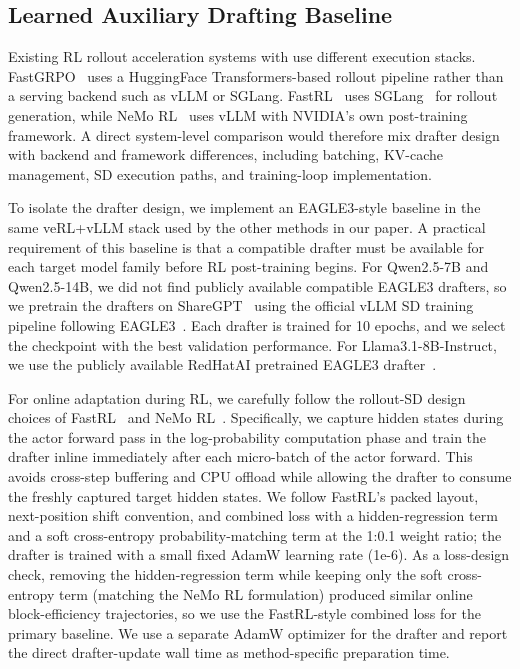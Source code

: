 

\subsection{Learned Auxiliary Drafting Baseline}
\label{app:learned_auxiliary_drafting}

Existing RL rollout acceleration systems with \learned{} use different execution stacks.
FastGRPO~\citep{zhang2025fastgrpo} uses a HuggingFace Transformers-based rollout pipeline rather than a serving backend such as vLLM or SGLang.
FastRL~\citep{hu2026taming} uses SGLang~\citep{zheng2024sglang} for rollout generation, while NeMo RL~\citep{iso2026accelerating} uses vLLM with NVIDIA's own post-training framework.
A direct system-level comparison would therefore mix drafter design with backend and framework differences, including batching, KV-cache management, SD execution paths, and training-loop implementation.

To isolate the drafter design, we implement an EAGLE3-style \learned{} baseline in the same veRL+vLLM stack used by the other methods in our paper.
A practical requirement of this baseline is that a compatible drafter must be available for each target model family before RL post-training begins.
For Qwen2.5-7B and Qwen2.5-14B, we did not find publicly available compatible EAGLE3 drafters, so we pretrain the drafters on ShareGPT~\citep{aeala2023sharegpt} using the official vLLM SD training pipeline following EAGLE3~\citep{li2025eagle}.
Each drafter is trained for 10 epochs, and we select the checkpoint with the best validation performance.
For Llama3.1-8B-Instruct, we use the publicly available RedHatAI pretrained EAGLE3 drafter~\citep{redhatai2025llama31eagle3}.

For online adaptation during RL, we carefully follow the rollout-SD design choices of FastRL~\citep{hu2026taming} and NeMo RL~\citep{iso2026accelerating}.
Specifically, we capture hidden states during the actor forward pass in the log-probability computation phase and train the drafter inline immediately after each micro-batch of the actor forward.
This avoids cross-step buffering and CPU offload while allowing the drafter to consume the freshly captured target hidden states.
We follow FastRL's packed layout, next-position shift convention, and combined loss with a hidden-regression term and a soft cross-entropy probability-matching term at the 1:0.1 weight ratio; the drafter is trained with a small fixed AdamW learning rate (1e-6).
As a loss-design check, removing the hidden-regression term while keeping only the soft cross-entropy term (matching the NeMo RL formulation) produced similar online block-efficiency trajectories, so we use the FastRL-style combined loss for the primary baseline.
We use a separate AdamW optimizer for the drafter and report the direct drafter-update wall time as method-specific preparation time.

